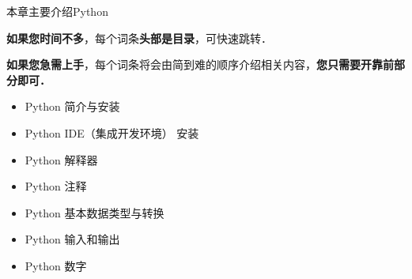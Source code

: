 
\begin{issues}
\issueTODO
\end{issues}

本章主要介绍Python

\textbf{如果您时间不多}，每个词条\textbf{头部是目录}，可快速跳转．

\textbf{如果您急需上手}，每个词条将会由简到难的顺序介绍相关内容，\textbf{您只需要开靠前部分即可．}

\begin{itemize}
\item Python 简介与安装
\item Python IDE（集成开发环境） 安装
\item Python 解释器
\item Python 注释
\item Python 基本数据类型与转换
\item Python 输入和输出
\item Python 数字
\end{itemize}
